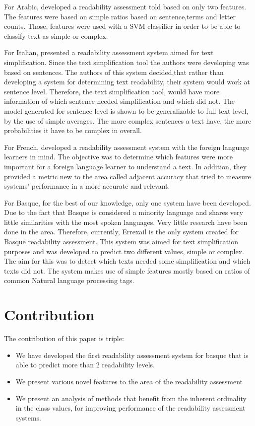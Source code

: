 \documentclass{acm_proc_article-sp}
\begin{document}
For Arabic, \cite{al2008towards} developed a readability assessment told based on only two features. The features were based on simple ratios based on sentence,terms and letter counts. Those, features were used with a SVM classifier in order to be able to classify text as simple or complex.

For Italian, \cite{dell2011read} presented a readability assessment system aimed for text simplification. Since the text simplification tool the authors were developing was based on sentences. The authors of this system decided,that rather than developing a system for determining text readability, their system would work at sentence level. Therefore, the text simplification tool, would have more information of which sentence needed simplification and which did not. The model generated for sentence level is shown to be generalizable to full text level, by the use of simple averages. The more complex sentences a text have, the more probabilities it have to be complex in overall.

For French,\cite{franccois2012ai} developed a readability assessment system with the foreign language learners in mind. The objective was to determine which features were more important for a foreign language learner to understand a text. In addition, they provided a metric new to the area called adjacent accuracy that tried to measure systems' performance in a more accurate and relevant. 

For Basque, for the best of our knowledge, only one system have been developed. Due to the fact that Basque is considered a minority language and shares very little similarities with the most spoken languages. Very little research have been done in the area. Therefore, currently, Errexail \cite{gonzalez2014simple} is the only system created for Basque readability assessment. This system was aimed for text simplification purposes and was developed to predict two different values, simple or complex. The aim for this was to detect which texts needed some simplification and which texts did not. The system makes use of simple features mostly based on ratios of common Natural language processing tags.


\section{Contribution}
The contribution of this paper is triple:

\begin{itemize}
\item We have developed the first readability assessment system for basque that is able to predict more than 2 readability levels.

\item We present various novel features to the area of the readability assessment

\item We present an analysis of methods that benefit from the inherent ordinality in the class values, for improving performance of the readability assessment systems.
\end{itemize}
\end{document}
